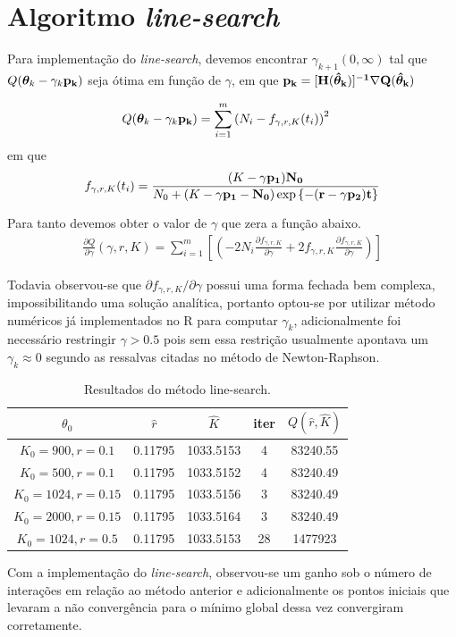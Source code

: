 \documentclass[a4paper,12pt,twoside]{article}
\begin{document}
\newpage
\section{Algoritmo \textit{line-search}}
Para implementação do \textit{line-search}, devemos encontrar $\gamma_{k+1} (0,\infty)$ tal que $Q(\bm{\theta}_k - \gamma_k\bf{p}_{k})$ seja ótima em função de $\gamma$, em que $\bf{p}_{k}=[\bf{H}(\hat{\bm{\theta}}_k)]^{-1}\nabla Q(\hat{\bm{\theta}}_k)$

\begin{align*}
Q(\bm{\theta}_k - \gamma_k\bf{p}_{k})&=\sum_{i=1}^{m}\left(N_i - f_{\gamma,r,K}(t_i)\right)^2
\end{align*}
em que 
\begin{align*}
f_{\gamma,r,K}(t_i)=\frac{(K-\gamma \bf{p}_{1}) N_0}{N_0 + (K-\gamma \bf{p}_{1}-N_0)\exp{\{-(r-\gamma \bf{p}_{2})t\}}}
\end{align*}

Para tanto devemos obter o valor de $\gamma$ que zera a função abaixo.
\begin{align*}
\frac{\partial Q}{\partial \gamma}(\gamma,r,K)=\sum_{i=1}^{m}\left[(-2N_i\frac{\partial  f_{\gamma,r,K}}{\partial \gamma} + 2f_{\gamma,r,K}\frac{\partial  f_{\gamma,r,K}}{\partial \gamma} ) \right]
\end{align*}

Todavia observou-se que $\partial f_{\gamma,r,K}/\partial \gamma$ possui uma forma fechada bem complexa, impossibilitando uma solução analítica, portanto optou-se por utilizar método numéricos já implementados no R para computar $\gamma_{k}$, adicionalmente foi necessário restringir $\gamma>0.5$ pois sem essa restrição usualmente apontava um $\gamma_{k}\approx 0$ segundo as ressalvas citadas no método de Newton-Raphson.
\begin{table}[H]
\centering
\caption{Resultados do método line-search.}
\begin{tabular}{ccccc}
\hline
$\theta_{0}$      & $\hat{r}$ & $\hat{K}$ & iter & $Q(\hat{r},\hat{K})$ \\ \hline
$K_0=900,r=0.1$   & 0.11795   & 1033.5153 & 4    & 83240.55             \\
$K_0=500,r=0.1$   & 0.11795   & 1033.5152 & 4    & 83240.49             \\
$K_0=1024,r=0.15$ & 0.11795   & 1033.5156 & 3    & 83240.49             \\
$K_0=2000,r=0.15$ & 0.11795   & 1033.5164 & 3    & 83240.49             \\
$K_0=1024,r=0.5$ & 0.11795   & 1033.5153 & 28    & 1477923             \\ \hline
\end{tabular}
\end{table}
Com a implementação do \textit{line-search}, observou-se um ganho sob o número de interações em relação ao método anterior e adicionalmente os pontos iniciais que levaram a não convergência para o mínimo global dessa vez convergiram corretamente.
\end{document}
